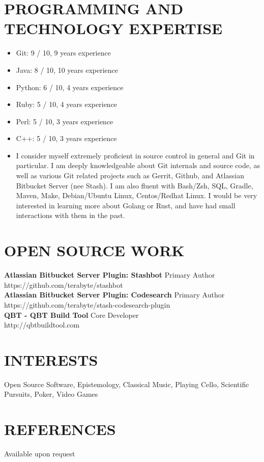 \documentclass[line, margin]{res}
\begin{document}
\begin{resume}
\section{PROGRAMMING AND TECHNOLOGY EXPERTISE}
\begin{itemize}
\item
Git: 9 / 10, 9 years experience
\item
Java: 8 / 10, 10 years experience
\item
Python: 6 / 10, 4 years experience
\item
Ruby: 5 / 10, 4 years experience
\item
Perl: 5 / 10, 3 years experience
\item
C++: 5 / 10, 3 years experience
\item
I consider myself extremely proficient in source control in general and Git in particular.  I am deeply knowledgeable about Git internals and source code, as well as various Git related projects such as Gerrit, Github, and Atlassian Bitbucket Server (nee Stash).
I am also fluent with Bash/Zsh, SQL, Gradle, Maven, Make, Debian/Ubuntu Linux, Centos/Redhat Linux.  I would be very interested in learning more about Golang or Rust, and have had small interactions with them in the past.
\end{itemize}

\section{OPEN SOURCE WORK}
{\bf Atlassian Bitbucket Server Plugin: Stashbot} \hfill Primary Author
\\
https://github.com/terabyte/stashbot
\\
{\bf Atlassian Bitbucket Server Plugin: Codesearch} \hfill Primary Author
\\
https://github.com/terabyte/stash-codesearch-plugin
\\
{\bf QBT - QBT Build Tool} \hfill Core Developer
\\
http://qbtbuildtool.com
\\

\section{INTERESTS}
Open Source Software, Epistemology, Classical Music, Playing Cello,
Scientific Pursuits, Poker, Video Games

\section{REFERENCES}
Available upon request

\end{resume}
\end{document}

